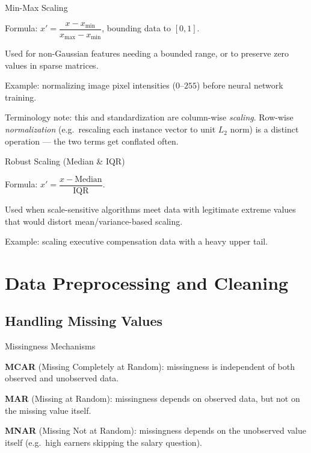 \begin{frame}{Min-Max Scaling}
    \begin{sitemize}
        \item Formula: $x' = \dfrac{x - x_{\min}}{x_{\max} - x_{\min}}$, bounding data to $[0,1]$.
        \item Used for non-Gaussian features needing a bounded range, or to preserve zero values in sparse matrices.
        \item Example: normalizing image pixel intensities ($0$--$255$) before neural network training.
        \item Terminology note: this and standardization are column-wise \emph{scaling}. Row-wise \emph{normalization} (e.g.\ rescaling each instance vector to unit $L_2$ norm) is a distinct operation — the two terms get conflated often.
    \end{sitemize}
\end{frame}


\begin{frame}{Robust Scaling (Median \& IQR)}
    \begin{sitemize}
        \item Formula: $x' = \dfrac{x - \text{Median}}{\text{IQR}}$.
        \item Used when scale-sensitive algorithms meet data with legitimate extreme values that would distort mean/variance-based scaling.
        \item Example: scaling executive compensation data with a heavy upper tail.
    \end{sitemize}
\end{frame}


\section{Data Preprocessing and Cleaning}

\subsection{Handling Missing Values}


\begin{frame}{Missingness Mechanisms}
    \begin{sitemize}
        \item \textbf{MCAR} (Missing Completely at Random): missingness is independent of both observed and unobserved data.
        \item \textbf{MAR} (Missing at Random): missingness depends on observed data, but not on the missing value itself.
        \item \textbf{MNAR} (Missing Not at Random): missingness depends on the unobserved value itself (e.g.\ high earners skipping the salary question).
    \end{sitemize}
\end{frame}


